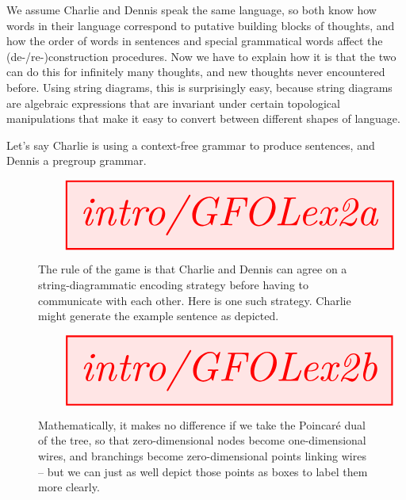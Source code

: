 We assume Charlie and Dennis speak the same language, so both know how words in their language correspond to putative building blocks of thoughts, and how the order of words in sentences and special grammatical words affect the (de-/re-)construction procedures. Now we have to explain how it is that the two can do this for infinitely many thoughts, and new thoughts never encountered before. Using string diagrams, this is surprisingly easy, because string diagrams are algebraic expressions that are invariant under certain topological manipulations that make it easy to convert between different shapes of language.

\begin{example} Let's say Charlie is using a context-free grammar to produce sentences, and Dennis a pregroup grammar. \\

\begin{figure}[h!]\label{fig:GFOLex2a}
\centering
\[\resizebox{\textwidth}{!}{\tikzfig{intro/GFOLex2a}}\]
\caption{The rule of the game is that Charlie and Dennis can agree on a string-diagrammatic encoding strategy before having to communicate with each other. Here is one such strategy. Charlie might generate the example sentence as depicted.}
\end{figure}

\begin{figure}[h!]\label{fig:GFOLex2b}
\centering
\[\resizebox{\textwidth}{!}{\tikzfig{intro/GFOLex2b}}\]
\caption{Mathematically, it makes no difference if we take the Poincar\'{e} dual of the tree, so that zero-dimensional nodes become one-dimensional wires, and branchings become zero-dimensional points linking wires -- but we can just as well depict those points as boxes to label them more clearly.}
\end{figure}


\end{example}
